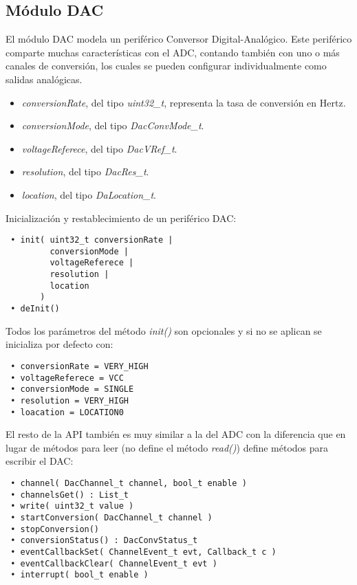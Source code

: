 \subsection{Módulo DAC}

El módulo DAC modela un periférico Conversor Digital-Analógico. Este periférico comparte muchas características con el ADC, contando también con uno o más canales de conversión, los cuales se pueden configurar individualmente como salidas analógicas.


\begin{itemize}
\item
\emph{conversionRate}, del tipo \emph{uint32\_t}, representa la tasa de conversión en Hertz.
\item
\emph{conversionMode}, del tipo \emph{DacConvMode\_t}.
\item
\emph{voltageReferece}, del tipo \emph{DacVRef\_t}.
\item
\emph{resolution}, del tipo \emph{DacRes\_t}.
\item
\emph{location}, del tipo \emph{DaLocation\_t}.
\end{itemize}


Inicialización y restablecimiento de un periférico DAC:

\begin{verbatim}
 • init( uint32_t conversionRate | 
         conversionMode | 
         voltageReferece | 
         resolution |
         location
       )
 • deInit()
\end{verbatim}

Todos los parámetros del método \emph{init()} son opcionales y si no se aplican se inicializa por defecto con:

\begin{verbatim}
 • conversionRate = VERY_HIGH
 • voltageReferece = VCC
 • conversionMode = SINGLE
 • resolution = VERY_HIGH
 • loacation = LOCATION0
\end{verbatim}

El resto de la API también es muy similar a la del ADC con la diferencia que en lugar de métodos para leer (no define el método \emph{read()}) define métodos para escribir el DAC:

\begin{verbatim}
 • channel( DacChannel_t channel, bool_t enable )
 • channelsGet() : List_t
 • write( uint32_t value )
 • startConversion( DacChannel_t channel )
 • stopConversion()
 • conversionStatus() : DacConvStatus_t
 • eventCallbackSet( ChannelEvent_t evt, Callback_t c )
 • eventCallbackClear( ChannelEvent_t evt )
 • interrupt( bool_t enable )
\end{verbatim}

